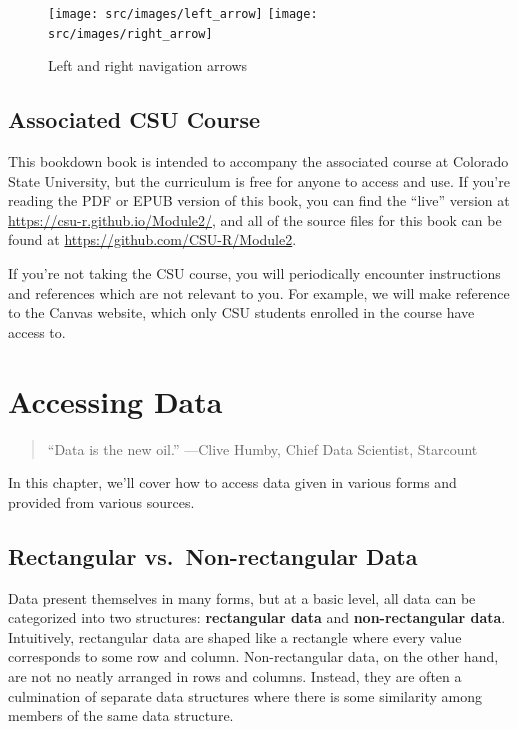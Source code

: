 \documentclass[
]{article}
\begin{document}
\begin{figure}

{\centering \texttt{[image: src/images/left\_arrow]} \texttt{[image: src/images/right\_arrow]} 

}

\caption{Left and right navigation arrows}\label{fig:unnamed-chunk-1}
\end{figure}

\hypertarget{associated-csu-course}{%
\subsection{Associated CSU Course}\label{associated-csu-course}}

This bookdown book is intended to accompany the associated course at Colorado State University, but the curriculum is free for anyone to access and use.
If you're reading the PDF or EPUB version of this book, you can find the ``live'' version at \url{https://csu-r.github.io/Module2/}, and all of the source files for this book can be found at \url{https://github.com/CSU-R/Module2}.

If you're not taking the CSU course, you will periodically encounter instructions and references which are not relevant to you. For example, we will make reference to the Canvas website, which only CSU students enrolled in the course have access to.

\hypertarget{AccessingData}{%
\section{Accessing Data}\label{AccessingData}}

\begin{quote}
``Data is the new oil.'' ---Clive Humby, Chief Data Scientist, Starcount
\end{quote}

In this chapter, we'll cover how to access data given in various forms and provided from various sources.

\hypertarget{rectangular-vs.-non-rectangular-data}{%
\subsection{Rectangular vs.~Non-rectangular Data}\label{rectangular-vs.-non-rectangular-data}}

Data present themselves in many forms, but at a basic level, all data can be categorized into two structures: \textbf{rectangular data} and \textbf{non-rectangular data}. Intuitively, rectangular data are shaped like a rectangle where every value corresponds to some row and column. Non-rectangular data, on the other hand, are not no neatly arranged in rows and columns. Instead, they are often a culmination of separate data structures where there is some similarity among members of the same data structure.
\end{document}
